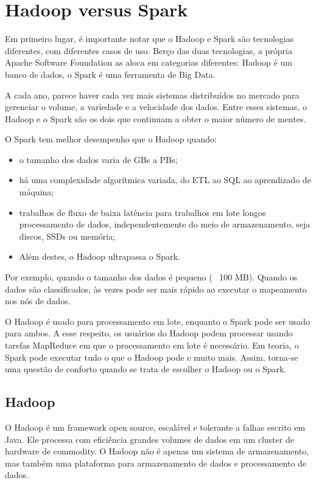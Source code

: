 \section{Hadoop versus Spark}
\label{sec:hadoopvsspark}

Em primeiro lugar, é importante notar que o Hadoop e Spark são tecnologias diferentes, com diferentes casos de uso. Berço das duas tecnologias, a própria Apache Software Foundation as aloca em categorias diferentes: Hadoop é um banco de dados, o Spark é uma ferramenta de Big Data.

A cada ano, parece haver cada vez mais sistemas distribuídos no mercado para gerenciar o volume, a variedade e a velocidade dos dados. Entre esses sistemas, o Hadoop e o Spark são os dois que continuam a obter o maior número de mentes.

O Spark tem melhor desempenho que o Hadoop quando:

\begin{itemize}
\item o tamanho dos dados varia de GBs a PBs;
\item há uma complexidade algorítmica variada, do ETL ao SQL ao aprendizado de máquina;
\item trabalhos de fluxo de baixa latência para trabalhos em lote longos
processamento de dados, independentemente do meio de armazenamento, seja discos, SSDs ou memória;
\item Além destes, o Hadoop ultrapassa o Spark.
\end{itemize}

Por exemplo, quando o tamanho dos dados é pequeno (~ 100 MB). Quando os dados são classificados, às vezes pode ser mais rápido ao executar o mapeamento nos nós de dados.

O Hadoop é usado para processamento em lote, enquanto o Spark pode ser usado para ambos. A esse respeito, os usuários do Hadoop podem processar usando tarefas MapReduce em que o processamento em lote é necessário. Em teoria, o Spark pode executar tudo o que o Hadoop pode e muito mais. Assim, torna-se uma questão de conforto quando se trata de escolher o Hadoop ou o Spark.

\subsection{Hadoop}
\label{sec:hadoop}

O Hadoop é um framework open source, escalável e tolerante a falhas escrito em Java. Ele processa com eficiência grandes volumes de dados em um cluster de hardware de commodity. O Hadoop não é apenas um sistema de armazenamento, mas também uma plataforma para armazenamento de dados e processamento de dados.

